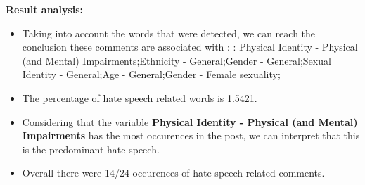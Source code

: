 \documentclass[11pt]{article}
\begin{document}
\textbf{\Large Result analysis:}

\begin{itemize}\item Taking into account the words that were detected, we can reach the conclusion these comments are associated with : : Physical Identity - Physical (and Mental) Impairments;Ethnicity - General;Gender - General;Sexual Identity - General;Age - General;Gender - Female sexuality;%

\item The percentage of hate speech related words is 1.5421.

\item Considering that the variable \textbf{Physical Identity - Physical (and Mental) Impairments} has the most occurences in the post, we can interpret that this is the predominant hate speech.

\item Overall there were 14/24 occurences of hate speech related comments.\end{itemize}
\end{document}
